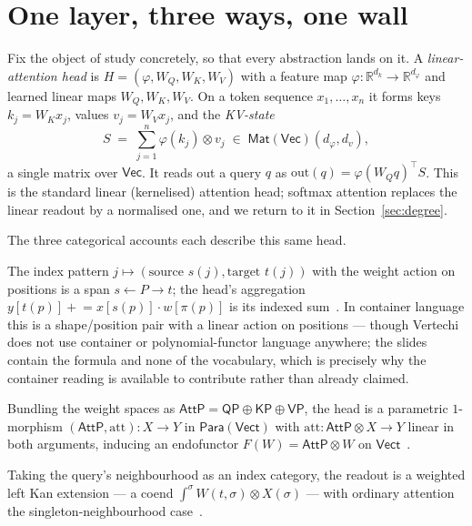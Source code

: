 \documentclass[11pt]{article}
\newcommand{\Vect}{\mathsf{Vect}}
\providecommand{\Vec}{}\renewcommand{\Vec}{\mathsf{Vec}}
\newcommand{\Para}{\mathsf{Para}}
\newcommand{\AttP}{\mathsf{AttP}}
\newcommand{\out}{\mathrm{out}}
\theoremstyle{plain}
\theoremstyle{definition}
\begin{document}
\section{One layer, three ways, one wall}\label{sec:layer}

Fix the object of study concretely, so that every abstraction lands on it. A
\emph{linear-attention head} is $H=(\varphi,W_Q,W_K,W_V)$ with a feature map
$\varphi:\mathbb{R}^{d_k}\to\mathbb{R}^{d_\varphi}$ and learned linear maps $W_Q,W_K,W_V$. On a
token sequence $x_1,\dots,x_n$ it forms keys $k_j=W_Kx_j$, values $v_j=W_Vx_j$, and the
\emph{KV-state}
\[
  S \;=\; \sum_{j=1}^{n} \varphi(k_j)\otimes v_j \;\in\; \mathsf{Mat}(\Vec)(d_\varphi,d_v),
\]
a single matrix over $\Vec$. It reads out a query $q$ as $\out(q)=\varphi(W_Qq)^{\!\top}S$. This
is the standard linear (kernelised) attention head; softmax attention replaces the linear
readout by a normalised one, and we return to it in Section~\ref{sec:degree}.

The three categorical accounts each describe this same head.

\begin{description}[leftmargin=1.3em,style=nextline]
\item[Span (Vertechi).] The index pattern $j\mapsto(\text{source }s(j),\text{target }t(j))$ with the
  weight action on positions is a span $s\leftarrow P\rightarrow t$; the head's aggregation
  $y[t(p)]\mathrel{+}=x[s(p)]\cdot w[\pi(p)]$ is its indexed sum~\cite{vertechi}. In container language
  this is a shape/position pair with a linear action on positions --- though Vertechi does not use
  container or polynomial-functor language anywhere; the slides contain the formula and none of the
  vocabulary, which is precisely why the container reading is available to contribute rather than
  already claimed.
\item[Endofunctor (O'Neill).] Bundling the weight spaces as $\AttP=\mathsf{QP}\oplus\mathsf{KP}\oplus\mathsf{VP}$,
  the head is a parametric $1$-morphism $(\AttP,\mathrm{att}):X\to Y$ in $\Para(\Vect)$ with
  $\mathrm{att}:\AttP\otimes X\to Y$ linear in both arguments, inducing an endofunctor
  $F(W)=\AttP\otimes W$ on $\Vect$~\cite[Thm.~3.1]{oneill}.
\item[Kan extension (Mahadevan).] Taking the query's neighbourhood as an index category, the readout
  is a weighted left Kan extension --- a coend $\int^{\sigma}W(t,\sigma)\otimes X(\sigma)$ --- with
  ordinary attention the singleton-neighbourhood case~\cite{ket}.
\end{description}
\end{document}
